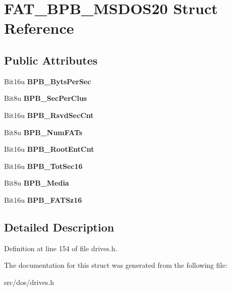 \hypertarget{structFAT__BPB__MSDOS20}{\section{F\-A\-T\-\_\-\-B\-P\-B\-\_\-\-M\-S\-D\-O\-S20 Struct Reference}
\label{structFAT__BPB__MSDOS20}
}
\subsection*{Public Attributes}
\begin{DoxyCompactItemize}
\item 
\hypertarget{structFAT__BPB__MSDOS20_a9c8bab9881b81078eca12ea70399c5c7}{Bit16u {\bfseries B\-P\-B\-\_\-\-Byts\-Per\-Sec}}\label{structFAT__BPB__MSDOS20_a9c8bab9881b81078eca12ea70399c5c7}

\item 
\hypertarget{structFAT__BPB__MSDOS20_a934426c8b1bfc99d7780978668a0d771}{Bit8u {\bfseries B\-P\-B\-\_\-\-Sec\-Per\-Clus}}\label{structFAT__BPB__MSDOS20_a934426c8b1bfc99d7780978668a0d771}

\item 
\hypertarget{structFAT__BPB__MSDOS20_a65309ab5ce01928f423172ba28b02ef3}{Bit16u {\bfseries B\-P\-B\-\_\-\-Rsvd\-Sec\-Cnt}}\label{structFAT__BPB__MSDOS20_a65309ab5ce01928f423172ba28b02ef3}

\item 
\hypertarget{structFAT__BPB__MSDOS20_ad28048020acb7f9fedb289cfddcd4c02}{Bit8u {\bfseries B\-P\-B\-\_\-\-Num\-F\-A\-Ts}}\label{structFAT__BPB__MSDOS20_ad28048020acb7f9fedb289cfddcd4c02}

\item 
\hypertarget{structFAT__BPB__MSDOS20_a2967df519eb3e0c4fdcea04a38e00a88}{Bit16u {\bfseries B\-P\-B\-\_\-\-Root\-Ent\-Cnt}}\label{structFAT__BPB__MSDOS20_a2967df519eb3e0c4fdcea04a38e00a88}

\item 
\hypertarget{structFAT__BPB__MSDOS20_af488e87fd923220f056e24c59e7c62d0}{Bit16u {\bfseries B\-P\-B\-\_\-\-Tot\-Sec16}}\label{structFAT__BPB__MSDOS20_af488e87fd923220f056e24c59e7c62d0}

\item 
\hypertarget{structFAT__BPB__MSDOS20_a2911d056e2653806f97c29877cbaa584}{Bit8u {\bfseries B\-P\-B\-\_\-\-Media}}\label{structFAT__BPB__MSDOS20_a2911d056e2653806f97c29877cbaa584}

\item 
\hypertarget{structFAT__BPB__MSDOS20_ac40120f59560ab05753694651519a4de}{Bit16u {\bfseries B\-P\-B\-\_\-\-F\-A\-T\-Sz16}}\label{structFAT__BPB__MSDOS20_ac40120f59560ab05753694651519a4de}

\end{DoxyCompactItemize}


\subsection{Detailed Description}


Definition at line 154 of file drives.\-h.



The documentation for this struct was generated from the following file\-:\begin{DoxyCompactItemize}
\item 
src/dos/drives.\-h\end{DoxyCompactItemize}
